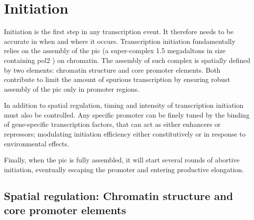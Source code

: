 \section{Initiation}






Initiation is the first step in any transcription event. 
It therefore needs to be accurate in when and where it occurs. 
Transcription initiation fundamentally relies on the assembly of the \gls{pic} (a super-complex 1.5 megadaltons in size  containing \gls{pol2} \cite{fazal:2015:real-time}) on chromatin.
The assembly of such complex is spatially defined by two elements: chromatin structure and core promoter elements.
Both contribute to limit the amount of spurious transcription by ensuring robust assembly of the \gls{pic} only in promoter regions.

In addition to spatial regulation, timing and intensity of transcription initiation must also be controlled.
Any specific promoter can be finely tuned by the binding of gene-specific transcription factors, that can act as either enhancers or repressors; modulating initiation efficiency either constitutively or in response to environmental effects. 

Finally, when the \gls{pic} is fully assembled, it will start several rounds of abortive initiation, eventually escaping the promoter and entering productive elongation.

\subsection{Spatial regulation: Chromatin structure and core promoter elements}

